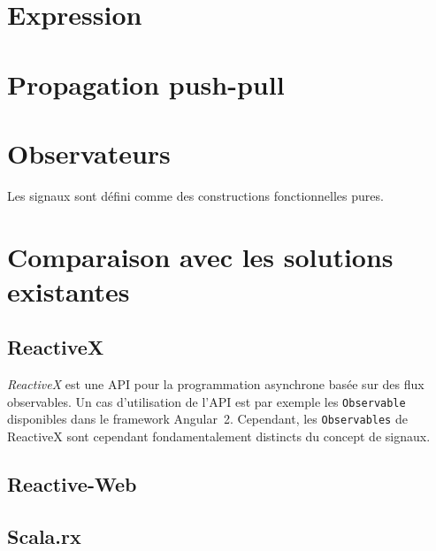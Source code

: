 \section{Expression}

\section{Propagation push-pull}

\section{Observateurs} \label{sec:sig-obs}

Les signaux sont défini comme des constructions fonctionnelles pures.

\section{Comparaison avec les solutions existantes}

\subsection{ReactiveX}

\emph{ReactiveX} est une API pour la programmation asynchrone basée sur des flux observables. Un cas d'utilisation de l'API est par exemple les \texttt{Observable} disponibles dans le framework Angular~2. Cependant, les \texttt{Observables} de ReactiveX sont cependant fondamentalement distincts du concept de signaux.

\subsection{Reactive-Web}
\subsection{Scala.rx}